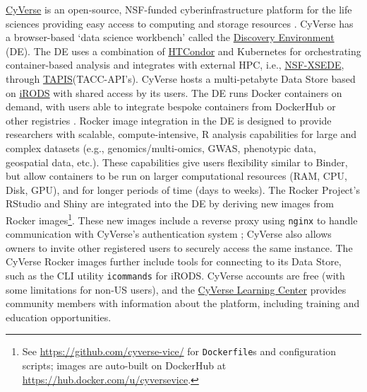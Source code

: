 \href{https://cyverse.org}{CyVerse} is an open-source, NSF-funded
cyberinfrastructure platform for the life sciences providing easy access
to computing and storage resources \citep{merchant_iplant_2016}. CyVerse
has a browser-based `data science workbench' called the
\href{https://cyverse.org/discovery-environment}{Discovery Environment}
(DE). The DE uses a combination of
\href{https://research.cs.wisc.edu/htcondor/}{HTCondor} and Kubernetes
for orchestrating container-based analysis and integrates with external
HPC, i.e., \href{https://www.xsede.org/}{NSF-XSEDE}, through
\href{https://www.tacc.utexas.edu/tapis}{TAPIS}(TACC-API's). CyVerse
hosts a multi-petabyte Data Store based on
\href{https://irods.org/}{iRODS} with shared access by its users. The DE
runs Docker containers on demand, with users able to integrate bespoke
containers from DockerHub or other registries
\citep{devisetty_bringing_2016}. Rocker image integration in the DE is
designed to provide researchers with scalable, compute-intensive, R
analysis capabilities for large and complex datasets (e.g.,
genomics/multi-omics, GWAS, phenotypic data, geospatial data, etc.).
These capabilities give users flexibility similar to Binder, but allow
containers to be run on larger computational resources (RAM, CPU, Disk,
GPU), and for longer periods of time (days to weeks). The Rocker
Project's RStudio and Shiny are integrated into the DE by deriving new
images from Rocker
images\footnote{See \href{https://github.com/cyverse-vice/}{https://github.com/cyverse-vice/} for \texttt{Dockerfile}s and configuration scripts; images are auto-built on DockerHub at \href{https://hub.docker.com/u/cyversevice}{https://hub.docker.com/u/cyversevice}.}.
These new images include a reverse proxy using \texttt{nginx} to handle
communication with CyVerse's authentication system
\citep{rstudio_proxy_2020}; CyVerse also allows owners to invite other
registered users to securely access the same instance. The CyVerse
Rocker images further include tools for connecting to its Data Store,
such as the CLI utility \texttt{icommands} for iRODS. CyVerse accounts
are free (with some limitations for non-US users), and the
\href{https://learning.cyverse.org/}{CyVerse Learning Center} provides
community members with information about the platform, including
training and education opportunities.


